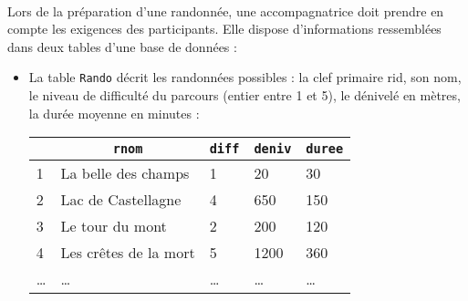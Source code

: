 \documentclass[11pt,a4paper]{article}
\begin{document}
\begin{Exercise}[title={Randonnée},origin={\bac \; d'après {\sc ccmp 2021 - pc, pc psi} (Partie 1)}]\\
	Lors de la préparation d'une randonnée, une accompagnatrice doit prendre en compte les exigences des participants. Elle dispose d'informations ressemblées dans deux tables d'une base de données :
	\begin{itemize}
		\item La table {\tt Rando} décrit les randonnées possibles : la clef primaire {\ttb rid}, son nom, le niveau de difficulté du parcours (entier entre 1 et 5), le dénivelé en mètres, la durée moyenne en minutes :
		      \begin{center}
			      \begin{tabular}{|l|l|l|l|l|}
				      \hline
				      \rowcolor{lightgray} \multicolumn{1}{|c|}{\ttb{\underline{rid}}} & \multicolumn{1}{|c|}{\textbf{\tt rnom}} & \multicolumn{1}{|c|}{\textbf{\tt diff}} & \multicolumn{1}{|c|}{\tt deniv} & \multicolumn{1}{|c|}{\textbf{\tt duree}} \\
				      \hline
				      1                                                                & La belle des champs                     & 1                                       & 20                              & 30                                       \\
				      \hline
				      2                                                                & Lac de Castellagne                      & 4                                       & 650                             & 150                                      \\
				      \hline
				      3                                                                & Le tour du mont                         & 2                                       & 200                             & 120                                      \\
				      \hline
				      4                                                                & Les crêtes de la mort                   & 5                                       & 1200                            & 360                                      \\
				      \hline
				      \dots                                                            & \dots                                   & \dots                                   & \dots                           & \dots                                    \\

\end{tabular}
\end{center}
\end{itemize}
\end{Exercise}
\end{document}
